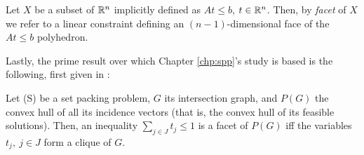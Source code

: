 \begin{definition}[Facet]
    \label{def:facet}

    Let $X$ be a subset of ${\mathbb{R}}^n$ implicitly defined as $At \leq b$, $t \in
    {\ensuremath{\mathbb{R}}}^n$. Then, by \emph{facet} of $X$ we refer to a linear constraint defining
    an $(n-1)$-dimensional face of the $At \leq b$ polyhedron.
\end{definition}

Lastly, the prime result over which Chapter \ref{chp:spp}'s study is based is
the following, first given in \cite{pa:facial-structure}:

\begin{theorem}
    \label{thm:padberg}

    Let \rm{(S)} be a set packing problem, $G$ its intersection graph, and
    $P(G)$ the convex hull of all its incidence vectors (that is, the convex
    hull of its feasible solutions). Then, an inequality $\sum_{j \in J} t_j
    \leq 1$ is a facet of $P(G)$ iff the variables $t_j,\ j \in J$ form a clique
    of $G$.
\end{theorem}
